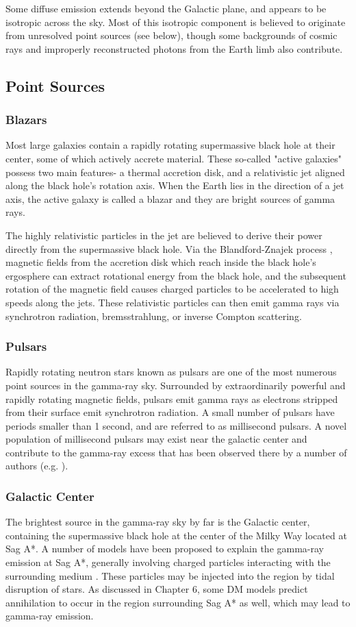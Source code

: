 Some diffuse emission extends beyond the Galactic plane, and appears to be isotropic across the sky. Most of this isotropic component is believed to originate from unresolved point sources (see below), though some backgrounds of cosmic rays and improperly reconstructed photons from the Earth limb also contribute.
\subsection{Point Sources}

\subsubsection{Blazars}
Most large galaxies contain a rapidly rotating supermassive black hole at their center, some of which actively accrete material. These so-called "active galaxies" possess two main features- a thermal accretion disk, and a relativistic jet aligned along the black hole's rotation axis. When the Earth lies in the direction of a jet axis, the active galaxy is called a blazar and they are bright sources of gamma rays.

The highly relativistic particles in the jet are believed to derive their power directly from the supermassive black hole. Via the Blandford-Znajek process \cite{blandford_znajek_1977}, magnetic fields from the accretion disk which reach inside the black hole's ergosphere can extract rotational energy from the black hole, and the subsequent rotation of the magnetic field causes charged particles to be accelerated to high speeds along the jets. These relativistic particles can then emit gamma rays via synchrotron radiation, bremsstrahlung, or inverse Compton scattering. 
\subsubsection{Pulsars}
Rapidly rotating neutron stars known as pulsars are one of the most numerous point sources in the gamma-ray sky. Surrounded by extraordinarily powerful and rapidly rotating magnetic fields, pulsars emit gamma rays as electrons stripped from their surface emit synchrotron radiation. A small number of pulsars have periods smaller than 1 second, and are referred to as millisecond pulsars. A novel population of millisecond pulsars may exist near the galactic center and contribute to the gamma-ray excess that has been observed there by a number of authors (e.g. \cite{bhakta_searching_2017}).
\subsubsection{Galactic Center}
	The brightest source in the gamma-ray sky by far is the Galactic center, containing the supermassive black hole at the center of the Milky Way located at Sag A*. A number of models have been proposed to explain the gamma-ray emission at Sag A*, generally involving charged particles interacting with the surrounding medium \cite{van_eldik_gamma_2015}. These particles may be injected into the region by tidal disruption of stars. As discussed in Chapter 6, some DM models predict annihilation to occur in the region surrounding Sag A* as well, which may lead to gamma-ray emission.

